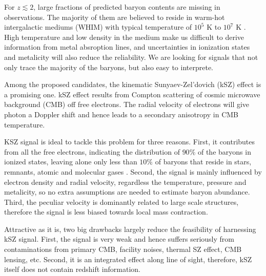 For $z\lesssim 2$, large fractions of predicted baryon contents are missing in observations.  
The majority of them are believed to reside in warm-hot intergalactic mediums (WHIM) with typical temperature of $10^5$ K to $10^7$ K \cite{Pen1999,Soltan06}. 
High temperature and low density in the medium make us difficult to derive information from metal absroption lines, 
and uncertainties in ionization states and metalicity will also reduce the reliability. 
We are looking for signals that not only trace the majority of the baryons, but also easy to interprete.

Among the proposed candidates, the kinematic Sunyaev-Zel'dovich (kSZ) effect \cite{Sunyaev72,Sunyaev80,Vishniac87} is a promising one.  
kSZ effect results from Compton scattering of cosmic microwave background (CMB) off free electrons. 
The radial velocity of electrons will give photon a Doppler shift 
and hence leads to a 
secondary anisotropy in CMB temperature.

KSZ signal is ideal to tackle this problem for three reasons. 
First, it contributes from all the free electrons, indicating the distribution of $90\%$ of the baryons in ionized states,   
leaving alone only less than $10\%$ of baryons that 
reside in stars, remnants, atomic and molecular gases \cite{Fukugita04}. 
%
Second, the signal is mainly influenced by electron density and radial velocity, 
regardless the temperature, pressure and metalicity,  
so no extra assumptions are needed to estimate baryon abundance.  
%
Third, the peculiar velocity is dominantly related to large scale structures, 
therefore the signal is less biased towards local mass contraction.  

Attractive as it is, two big drawbacks largely reduce the feasibility of harnessing kSZ signal.  
First, the signal is very weak 
and hence suffers seriously from contaminations 
from primary CMB, facility noises, 
thermal SZ effect, CMB lensing, etc.  
Second, it is an integrated effect along line of sight, therefore, kSZ itself does not contain redshift information.

